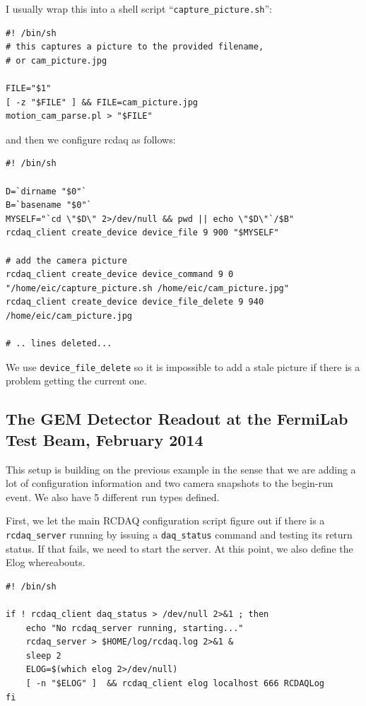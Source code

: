 \documentclass{article}[11pt]
\begin{document}
I usually wrap this into a shell script ``\verb|capture_picture.sh|'':

\begin{verbatim}
#! /bin/sh
# this captures a picture to the provided filename,
# or cam_picture.jpg

FILE="$1"
[ -z "$FILE" ] && FILE=cam_picture.jpg
motion_cam_parse.pl > "$FILE"

\end{verbatim}

and then we configure rcdaq as follows:
\label{packet900}

\begin{verbatim} 
#! /bin/sh

D=`dirname "$0"`
B=`basename "$0"`
MYSELF="`cd \"$D\" 2>/dev/null && pwd || echo \"$D\"`/$B"
rcdaq_client create_device device_file 9 900 "$MYSELF"

# add the camera picture
rcdaq_client create_device device_command 9 0 "/home/eic/capture_picture.sh /home/eic/cam_picture.jpg"
rcdaq_client create_device device_file_delete 9 940 /home/eic/cam_picture.jpg

# .. lines deleted...
\end{verbatim}

We use \verb|device_file_delete| so it is impossible to add a stale
picture if there is a problem getting the current one.

\subsection{The GEM Detector Readout at the FermiLab Test Beam, February 2014}

This setup is building on the previous example in the sense that 
we are adding a lot of configuration information and two camera 
snapshots to the begin-run event. We also have 5 different run types defined.

First, we let the main RCDAQ configuration script figure out if there
is a \verb|rcdaq_server| running by issuing a \verb|daq_status|
command and testing its return status. If that fails, we need to start
the server. At this point, we also define the Elog whereabouts.

\begin{verbatim} 
#! /bin/sh

if ! rcdaq_client daq_status > /dev/null 2>&1 ; then
    echo "No rcdaq_server running, starting..."
    rcdaq_server > $HOME/log/rcdaq.log 2>&1 &
    sleep 2
    ELOG=$(which elog 2>/dev/null)
    [ -n "$ELOG" ]  && rcdaq_client elog localhost 666 RCDAQLog
fi
\end{verbatim} 
\end{document}
